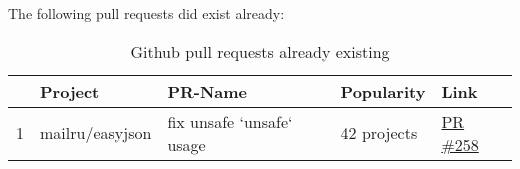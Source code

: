 The following pull requests did exist already:

\begin{table}[h]
    \centering
    \caption{Github pull requests already existing}
    \label{tbl:pull-requests-existing}
    \begin{tabularx}{\textwidth}{rlXll}
        \toprule
        {} & Project & PR-Name & Popularity & Link \\
        \midrule
        1  & mailru/easyjson & fix unsafe `unsafe` usage & 42 projects & \href{https://github.com/mailru/easyjson/pull/258}{PR \#258} \\
        \bottomrule
    \end{tabularx}
\end{table}
